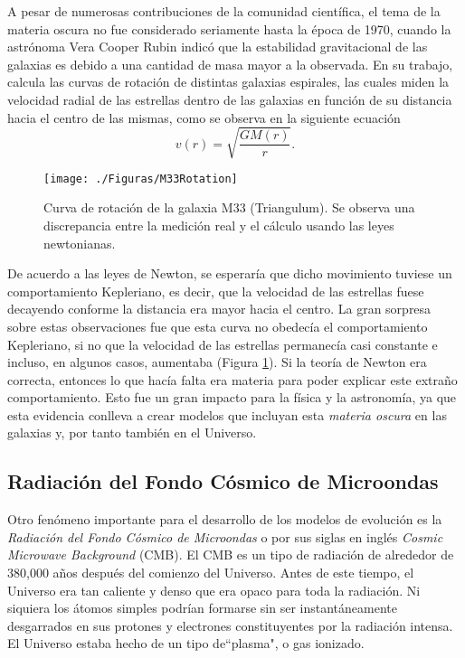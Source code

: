 \documentclass[a4paper,openright,10pt, oneside, final]{book}
\begin{document}
A pesar de numerosas contribuciones de la comunidad científica, el tema de la materia oscura no fue considerado seriamente hasta la época de 1970, cuando la astrónoma Vera Cooper Rubin \cite{1.1.2} indicó que la estabilidad gravitacional de las galaxias es debido a una cantidad de masa mayor a la observada. En su trabajo, calcula las curvas de rotación de distintas galaxias espirales, las cuales miden la velocidad radial de las estrellas dentro de las galaxias en función de su distancia hacia el centro de las mismas, como se observa en la siguiente ecuación
\begin{equation}
v (r)
=
\sqrt{\frac{G M (r)}{r}}.\label{eqn 1.42}
\end{equation} 
\begin{figure}
\centering
    \texttt{[image: ./Figuras/M33Rotation]}
  \caption{\footnotesize{Curva de rotación de la galaxia M33 (Triangulum). Se observa una discrepancia entre la medición real y el cálculo usando las leyes newtonianas.}}
  \label{fig 1.2}
\end{figure}
De acuerdo a las leyes de Newton, se esperaría que dicho movimiento tuviese un comportamiento Kepleriano, es decir, que la velocidad de las estrellas fuese decayendo conforme la distancia era mayor hacia el centro. La gran sorpresa sobre estas observaciones fue que esta curva no obedecía el comportamiento Kepleriano, si no que la velocidad de las estrellas permanecía casi constante e incluso, en algunos casos, aumentaba (Figura \ref{fig 1.2}). Si la teoría de Newton era correcta, entonces lo que hacía falta era materia para poder explicar este extraño comportamiento. Esto fue un gran impacto para la física y la astronomía, ya que esta evidencia conlleva a crear modelos que incluyan esta \textit{materia oscura} en las galaxias y, por tanto también en el Universo.

\subsection*{Radiación del Fondo Cósmico de Microondas}
Otro fenómeno importante para el desarrollo de los modelos de evolución es la \textit{Radiación del Fondo Cósmico de Microondas} o por sus siglas en inglés \textit{Cosmic Microwave Background} (CMB). El CMB es un tipo de radiación de alrededor de 380,000 años después del comienzo del Universo. Antes de este tiempo, el Universo era tan caliente y denso que era opaco para toda la radiación. Ni siquiera los átomos simples podrían formarse sin ser instantáneamente desgarrados en sus protones y electrones constituyentes por la radiación intensa. El Universo estaba hecho de un tipo de``plasma", o gas ionizado.
\end{document}
